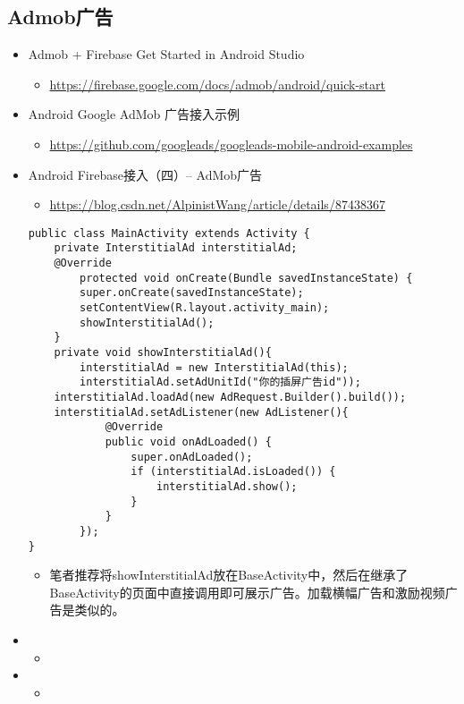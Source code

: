 \documentclass[9pt, b5paper]{article}
\begin{document}
\subsection{Admob广告}
\label{sec-2-5}
\begin{itemize}
\item Admob + Firebase Get Started in Android Studio
\begin{itemize}
\item \url{https://firebase.google.com/docs/admob/android/quick-start}
\end{itemize}
\item Android Google AdMob 广告接入示例
\begin{itemize}
\item \url{https://github.com/googleads/googleads-mobile-android-examples}
\end{itemize}
\item Android Firebase接入（四）-- AdMob广告
\begin{itemize}
\item \url{https://blog.csdn.net/AlpinistWang/article/details/87438367}
\end{itemize}
\begin{verbatim}
public class MainActivity extends Activity {
    private InterstitialAd interstitialAd;
    @Override
        protected void onCreate(Bundle savedInstanceState) {
        super.onCreate(savedInstanceState);
        setContentView(R.layout.activity_main);
        showInterstitialAd();
    }
    private void showInterstitialAd(){
        interstitialAd = new InterstitialAd(this);
        interstitialAd.setAdUnitId("你的插屏广告id"));
    interstitialAd.loadAd(new AdRequest.Builder().build());
    interstitialAd.setAdListener(new AdListener(){
            @Override
            public void onAdLoaded() {
                super.onAdLoaded();
                if (interstitialAd.isLoaded()) {
                    interstitialAd.show();
                }
            }
        });
}
\end{verbatim}
\begin{itemize}
\item 笔者推荐将showInterstitialAd放在BaseActivity中，然后在继承了BaseActivity的页面中直接调用即可展示广告。加载横幅广告和激励视频广告是类似的。
\end{itemize}
\item \begin{itemize}
\item 
\end{itemize}
\item \begin{itemize}
\item 
\end{itemize}
\end{itemize}
\end{document}
